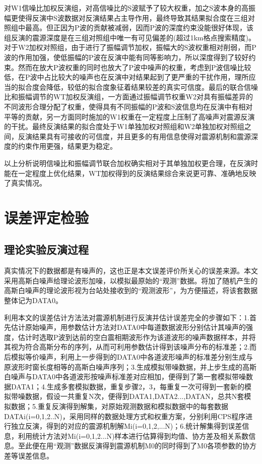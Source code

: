 对W1信噪比加权反演组，对高信噪比的S波赋予了较大权重，加之S波本身的高振幅更使得反演中S波数据对反演结果占主导作用，最终导致其结果拟合度在三组对照组中最高。但正因为P波的贡献被减弱，因而P波的深度约束没能很好体现，该组反演的震源深度是在三组对照组中唯一有可见偏差的(超过1km格点搜索精度)。对于W2加权对照组，由于进行了振幅调节加权，振幅大的S波权重相对削弱，而P波的作用加强，使低振幅的P波在反演中能有同等影响力，所以深度得到了较好约束。然而在放大P波权重的同时也放大了P波中噪声的权重，考虑到P波信噪比较低，在P波中占比较大的噪声也在反演中对结果起到了更严重的干扰作用，理所应当的拟合度会降低，较低的拟合度象征着结果较差的真实可信度。最后的联合信噪比和振幅调节的WT加权反演组，一方面通过振幅调节权重W2对具有振幅差异的不同波形合理分配了权重，使得具有不同振幅的P波和S波信息均在反演中有相对平等的贡献，另一方面同时施加的W1权重在一定程度上压制了高噪声对震源反演的干扰。最终反演结果的拟合度处于W1单独加权对照组和W2单独加权对照组之间，反演结果具有可接收的可信度，并且更多的有用信息使得对震源机制和震源深度的约束作用更强，结果更为稳定。

以上分析说明信噪比和振幅调节联合加权确实相对于其单独加权更合理，在反演时能在一定程度上优化结果，WT加权得到的反演结果综合来说更可靠、准确地反映了真实情况。

\section{误差评定检验}

\subsection{理论实验反演过程}
真实情况下的数据都是有噪声的，这也正是本文误差评价所关心的误差来源。本文采用高斯白噪声给理论波形加噪，以模拟最原始的“观测”数据。将加了随机产生的高斯白噪声的理论波形视为台站处接收到的“观测波形”，为方便描述，将该套数据整体记为DATA0。

利用本文的误差估计方法法对震源机制进行反演并估计误差完全的步骤如下：1.首先估计原始噪声，用参数估计方法对DATA0中每道数据波形分别估计其噪声的强度，估计时选取P波到达前的空白震相期波形作为该道波形的噪声数据样本，并将其视为符合高斯分布的序列，从而可利用参数估计得到该噪声分布的标准差；2.而后模拟等价噪声，利用上一步得到的DATA0中各道波形噪声的标准差分别生成与原波形时窗长度相等的高斯白噪声序列；3.生成模拟带噪数据，并上步生成的高斯白噪声与DATA0中各道波形按噪声标准差对应相加，便得到了第一套模拟带噪数据DATA1；4.生成多套模拟数据，重复步骤2，3，每重复一次可得到一套新的模拟带噪数据，假设一共重复N次，便得到DATA1,DATA2...,DATAN，总共N套模拟数据；5.重复反演得到解集，对原始观测数据和模拟数据中的每套数据DATAi(i=0,1,2..N)，采用同样的数据处理方式和权重方案，分别利用CPS程序进行独立反演，得到的对应的震源机制解Mi(i=0,1,2,...N)；6.统计解集得到误差信息，利用统计方法对Mi(i=0,1,2...N)样本进行估算得到均值、协方差及相关系数信息。至此便在用“观测”数据反演得到震源机制M0的同时得到了M0各项参数的协方差等误差信息。

